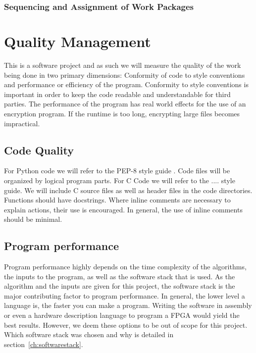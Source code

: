 \subsubsection{Sequencing and Assignment of Work Packages}
\label{ch:sequencingandassignment}




\section{Quality Management}
\label{ch:qualitymanagement}
This is a software project and as such we will measure the quality of the work being done in two primary dimensions: Conformity of code to style conventions and performance or efficiency of the program. Conformity to style conventions is important in order to keep the code readable and understandable for third parties. The performance of the program has real world effects for the use of an encryption program. If the runtime is too long, encrypting large files becomes impractical.

\subsection{Code Quality}
\label{ch:codequality}
For Python code we will refer to the PEP-8 style guide \cite{pep8}. Code files will be organized by logical program parts. For C Code we will refer to the .... style guide. We will include C source files as well as header files in the code directories. Functions should have docstrings. Where inline comments are necessary to explain actions, their use is encouraged. In general, the use of inline comments should be minimal.

\subsection{Program performance}
\label{ch:programperformance}
Program performance highly depends on the time complexity of the algorithms, the inputs to the program, as well as the software stack that is used. As the algorithm and the inputs are given for this project, the software stack is the major contributing factor to program performance. In general, the lower level a language is, the faster you can make a program. Writing the software in assembly or even a hardware description language to program a \ac{FPGA} would yield the best results. However, we deem these options to be out of scope for this project. Which software stack was chosen and why is detailed in section~\ref{ch:softwarestack}.

